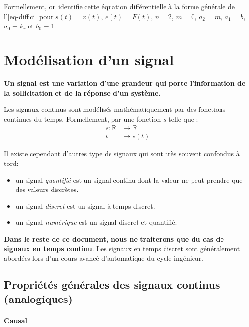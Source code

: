 Formellement, on identifie cette équation différentielle à la forme générale 
de l'\cref{eq-difflci} pour $s(t)=x(t)$, $e(t)=F(t)$, 
$n=$2, $m=0$, $a_2=m$, $a_1=b$, $a_0=k_r$ et $b_0=$1.




\section{Modélisation d'un signal}
\textbf{Un signal est une variation d'une grandeur qui porte l'information de la 
sollicitation et de la réponse d'un système.}

Les signaux continus sont modélisés mathématiquement par des fonctions continues 
du temps. Formellement, par une fonction $s$ telle que :
\begin{align*}
s : \mathbb{R}&\rightarrow\mathbb{R} \\  
t&\rightarrow s(t) 
\end{align*}    

Il existe cependant d'autres type de signaux qui sont très souvent confondus à tord:
\begin{itemize}
    \item un signal \emph{quantifié} est un signal continu 
          dont la valeur ne peut prendre que des valeurs discrètes. 
    \item un signal \emph{discret} est un signal à temps discret.
    \item un signal \emph{numérique} est un signal discret et quantifié.   
\end{itemize}

\textbf{Dans le reste de ce document, nous ne traiterons que
du cas de signaux en temps continu}. Les signaux en temps discret
sont généralement abordées lors d'un cours 
avancé d'automatique du cycle ingénieur.

\newpage
\subsection{Propriétés générales des signaux continus (analogiques)}

\paragraph{Causal}

